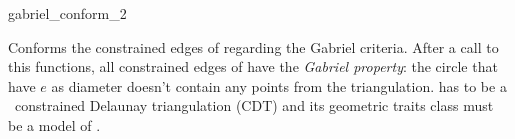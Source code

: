 \begin{ccRefFunction}{gabriel_conform_2}


{ Conforms the constrained edges of  regarding the Gabriel
  criteria. After a call to this functions, all constrained edges of
   have the \emph{Gabriel property}: the circle that have $e$
  as diameter doesn't contain any points from the triangulation.
  \ccPrecond {} has to be a \cgal\ constrained Delaunay
  triangulation (CDT) and its geometric traits class must be a model
  of .}

\end{ccRefFunction}
